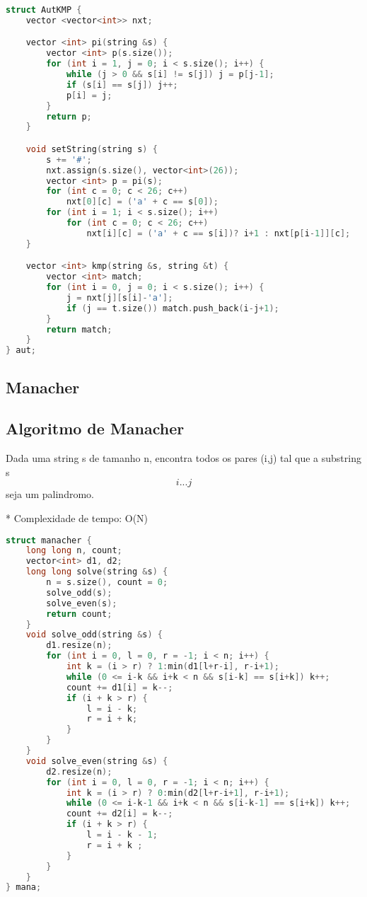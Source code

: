\documentclass[11pt, a4paper, twoside]{article}
\begin{document}
\begin{lstlisting}[language=C++]
struct AutKMP {
    vector <vector<int>> nxt;

    vector <int> pi(string &s) {
        vector <int> p(s.size());
        for (int i = 1, j = 0; i < s.size(); i++) {
            while (j > 0 && s[i] != s[j]) j = p[j-1];
            if (s[i] == s[j]) j++;
            p[i] = j;
        }
        return p;
    }

    void setString(string s) {
        s += '#';
        nxt.assign(s.size(), vector<int>(26));
        vector <int> p = pi(s);
        for (int c = 0; c < 26; c++)
            nxt[0][c] = ('a' + c == s[0]);
        for (int i = 1; i < s.size(); i++)
            for (int c = 0; c < 26; c++)
                nxt[i][c] = ('a' + c == s[i])? i+1 : nxt[p[i-1]][c];
    }

    vector <int> kmp(string &s, string &t) {
        vector <int> match;
        for (int i = 0, j = 0; i < s.size(); i++) {
            j = nxt[j][s[i]-'a'];
            if (j == t.size()) match.push_back(i-j+1); 
        }
        return match;
    }
} aut;
\end{lstlisting}

\subsection{Manacher}

\subsection{Algoritmo de Manacher}



Dada uma string s de tamanho n, encontra todos os pares (i,j) tal que a substring s\[i...j\] seja um palindromo.

* Complexidade de tempo: O(N)

\begin{lstlisting}[language=C++]
struct manacher {
    long long n, count;
    vector<int> d1, d2;
    long long solve(string &s) {
        n = s.size(), count = 0;
        solve_odd(s);
        solve_even(s);
        return count;
    }
    void solve_odd(string &s) {
        d1.resize(n);
        for (int i = 0, l = 0, r = -1; i < n; i++) {
            int k = (i > r) ? 1:min(d1[l+r-i], r-i+1);
            while (0 <= i-k && i+k < n && s[i-k] == s[i+k]) k++;
            count += d1[i] = k--;
            if (i + k > r) {
                l = i - k;
                r = i + k;
            }
        }
    }
    void solve_even(string &s) {
        d2.resize(n);
        for (int i = 0, l = 0, r = -1; i < n; i++) {
            int k = (i > r) ? 0:min(d2[l+r-i+1], r-i+1);
            while (0 <= i-k-1 && i+k < n && s[i-k-1] == s[i+k]) k++;
            count += d2[i] = k--;
            if (i + k > r) {
                l = i - k - 1;
                r = i + k ;
            }
        }
    }
} mana;
\end{lstlisting}
\end{document}
